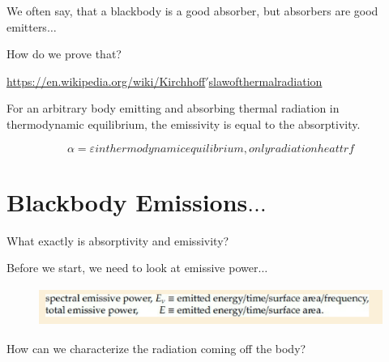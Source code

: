 \documentclass[12pt]{article}
\renewcommand{\_}{\kern-1.5pt\textunderscore\kern-1.5pt}
\begin{document}
We often say, that a blackbody is a good absorber, but absorbers are good emitters$ \ldots $ \par

How do we prove that?\par


\href{https://en.wikipedia.org/wiki/Kirchhoff\%27s_law_of_thermal_radiation}{https://en.wikipedia.org/wiki/Kirchhoff$'$s\_law\_of\_thermal\_radiation}\par


\setlength{\parskip}{0.0pt}
{\fontsize{10pt}{12.0pt}\selectfont \textcolor[HTML]{222222}{For an arbitrary body emitting and absorbing thermal radiation in thermodynamic equilibrium, the emissivity is equal to the absorptivity.}\par}\par


\vspace{\baselineskip}
 \[  \alpha = \varepsilon  in thermodynamic equilibrium, only radiation heat trf \] \par

\setlength{\parskip}{8.04pt}
\section*{Blackbody Emissions$ \ldots $ }
What exactly is absorptivity and emissivity?\par

Before we start, we need to look at emissive power$ \ldots $ \par




\begin{figure}[H]
	\begin{Center}
		\includegraphics[width=5.05in,height=0.5in]{./media/image5.png}
	\end{Center}
\end{figure}



\par

How can we characterize the radiation coming off the body?\par
\end{document}
